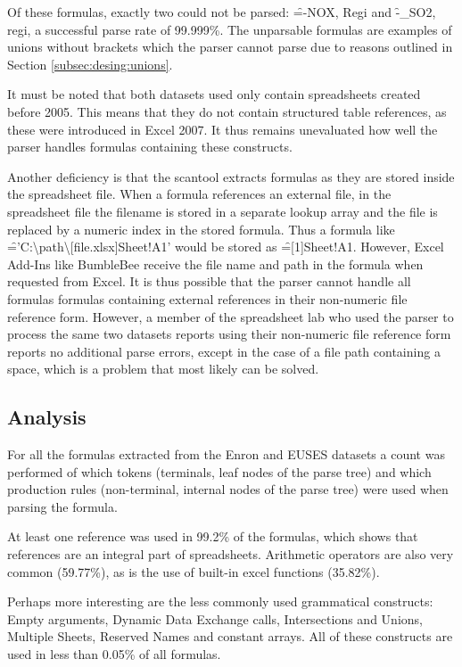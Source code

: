 Of these formulas, exactly two could not be parsed: \f{=-NOX, Regi} and \f{-_SO2, regi}, a successful parse rate of 99.999\%.
The unparsable formulas are examples of unions without brackets which the parser cannot parse due to reasons outlined in Section \ref{subsec:desing:unions}.
 
It must be noted that both datasets used only contain spreadsheets created before 2005.
This means that they do not contain structured table references, as these were introduced in Excel 2007.
It thus remains unevaluated how well the parser handles formulas containing these constructs.

Another deficiency is that the scantool extracts formulas as they are stored inside the spreadsheet file.
When a formula references an external file, in the spreadsheet file the filename is stored in a separate lookup array and the file is replaced by a numeric index in the stored formula.
Thus a formula like \f{='C:\textbackslash path\textbackslash [file.xlsx]Sheet!A1'} would be stored as \f{=[1]Sheet!A1}.
However, Excel Add-Ins like BumbleBee receive the file name and path in the formula when requested from Excel.
It is thus possible that the parser cannot handle all formulas formulas containing external references in their non-numeric file reference form.
However, a member of the spreadsheet lab who used the parser to process the same two datasets reports using their non-numeric file reference form reports no additional parse errors, except in the case of a file path containing a space, which is a problem that most likely can be solved.

\subsection{Analysis}

For all the formulas extracted from the Enron and EUSES datasets a count was performed of which tokens (terminals, leaf nodes of the parse tree) and which production rules (non-terminal, internal nodes of the parse tree) were used when parsing the formula.

At least one reference was used in 99.2\% of the formulas, which shows that references are an integral part of spreadsheets.
Arithmetic operators are also very common (59.77\%), as is the use of built-in excel functions (35.82\%).

Perhaps more interesting are the less commonly used grammatical constructs: Empty arguments, Dynamic Data Exchange calls, Intersections and Unions, Multiple Sheets, Reserved Names and constant arrays.
All of these constructs are used in less than 0.05\% of all formulas.

